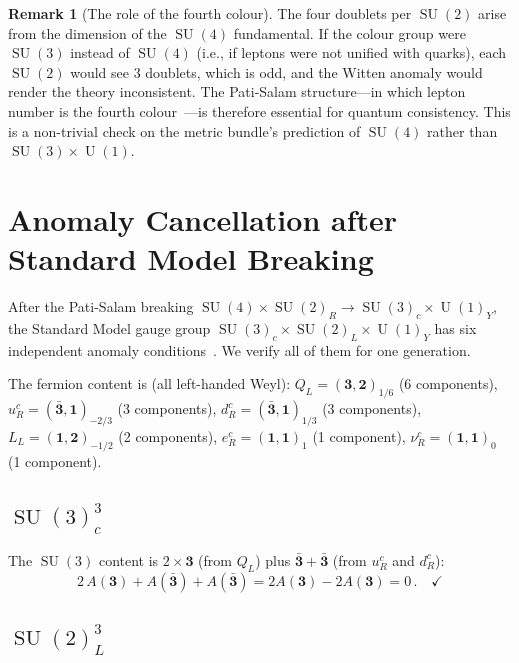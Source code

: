 \documentclass[12pt,a4paper]{article}
\theoremstyle{definition}
\newtheorem{remark}[theorem]{Remark}
\newcommand{\SU}{\operatorname{SU}}
\newcommand{\U}{\operatorname{U}}
\begin{document}
\begin{remark}[The role of the fourth colour]
The four doublets per $\SU(2)$ arise from the dimension of the $\SU(4)$ fundamental.
If the colour group were $\SU(3)$ instead of $\SU(4)$ (i.e., if leptons were not unified with quarks), each $\SU(2)$ would see $3$ doublets, which is odd, and the Witten anomaly would render the theory inconsistent.
The Pati-Salam structure---in which lepton number is the fourth colour~\cite{PatiSalam1974}---is therefore essential for quantum consistency.
This is a non-trivial check on the metric bundle's prediction of $\SU(4)$ rather than $\SU(3) \times \U(1)$.
\end{remark}


\section{Anomaly Cancellation after Standard Model Breaking}
\label{sec:SM_anomalies}

After the Pati-Salam breaking $\SU(4) \times \SU(2)_R \to \SU(3)_c \times \U(1)_Y$, the Standard Model gauge group $\SU(3)_c \times \SU(2)_L \times \U(1)_Y$ has six independent anomaly conditions~\cite{BouchiatIliopoulosMeyer1972}.
We verify all of them for one generation.

The fermion content is (all left-handed Weyl):
$Q_L = (\mathbf{3}, \mathbf{2})_{1/6}$ (6 components),
$u_R^c = (\bar{\mathbf{3}}, \mathbf{1})_{-2/3}$ (3 components),
$d_R^c = (\bar{\mathbf{3}}, \mathbf{1})_{1/3}$ (3 components),
$L_L = (\mathbf{1}, \mathbf{2})_{-1/2}$ (2 components),
$e_R^c = (\mathbf{1}, \mathbf{1})_{1}$ (1 component),
$\nu_R^c = (\mathbf{1}, \mathbf{1})_{0}$ (1 component).

\subsection{$\SU(3)_c^3$}

The $\SU(3)$ content is $2 \times \mathbf{3}$ (from $Q_L$) plus $\mathbf{\bar{3}} + \mathbf{\bar{3}}$ (from $u_R^c$ and $d_R^c$):
\begin{equation}
2\, A(\mathbf{3}) + A(\bar{\mathbf{3}}) + A(\bar{\mathbf{3}}) = 2A(\mathbf{3}) - 2A(\mathbf{3}) = 0\,. \quad\checkmark
\end{equation}

\subsection{$\SU(2)_L^3$}
\end{document}
